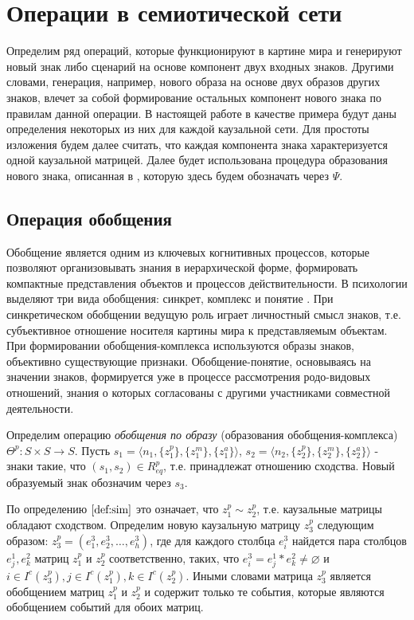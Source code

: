 \documentclass[12pt]{scrartcl}
\begin{document}
	\section{Операции в семиотической сети}\label{sec:operations}
	Определим ряд операций, которые функционируют в картине мира и генерируют новый знак либо сценарий на основе компонент двух входных знаков. Другими словами, генерация, например, нового образа на основе двух образов других знаков, влечет за собой формирование остальных компонент нового знака по  правилам данной операции. В настоящей работе в качестве примера будут даны определения некоторых из них для каждой каузальной сети. Для простоты изложения будем далее считать, что каждая компонента знака характеризуется одной каузальной матрицей. Далее будет использована процедура образования нового знака, описанная в \cite{Osipov2014c}, которую здесь будем обозначать через $\Psi$.
	
	\subsection{Операция обобщения}
	
	Обобщение является одним из ключевых когнитивных процессов, которые позволяют организовывать знания в иерархической форме, формировать компактные представления объектов и процессов действительности. В психологии выделяют три вида обобщения: синкрет, комплекс и понятие \cite{Vygotsky1999}. При синкретическом обобщении ведущую роль играет личностный смысл знаков, т.е. субъективное отношение носителя картины мира к представляемым объектам. При формировании обобщения-комплекса используются образы знаков, объективно существующие признаки. Обобщение-понятие, основываясь на значении знаков, формируется уже в процессе рассмотрения родо-видовых отношений, знания о которых согласованы с другими участниками совместной деятельности.
	
	Определим операцию \textit{обобщения по образу} (образования обобщения-комплекса) $\Theta^p: S\times S\rightarrow S$. Пусть $s_1=\langle n_1, \{z_1^p\}, \{z_1^m\}, \{z_1^a\} \rangle$, $s_2=\langle n_2, \{z_2^p\}, \{z_2^m\}, \{z_2^a\} \rangle$ - знаки такие, что $(s_1,s_2)\in R_{eq}^p$, т.е. принадлежат отношению сходства. Новый образуемый знак обозначим через $s_3$. 
	
	По определению $\autoref{def:sim}$ это означает, что $z_1^p\sim z_2^p$, т.е. каузальные матрицы обладают сходством. Определим новую каузальную матрицу $z_3^p$ следующим образом: $z_3^p=(e_1^3,e_2^3,\dots,e_h^3)$, где для каждого столбца $e_i^3$ найдется пара столбцов $e_j^1, e_k^2$ матриц $z_1^p$ и $z_2^p$ соответственно, таких, что $e_i^3=e_j^1*e_k^2\not=\varnothing$ и $i\in I^c(z_3^p), j\in I^c(z_1^p), k\in I^c(z_2^p)$. Иными словами матрица $z_3^p$ является обобщением матриц $z_1^p$ и $z_2^p$ и содержит только те события, которые являются обобщением событий для обоих матриц.
	
\end{document}
